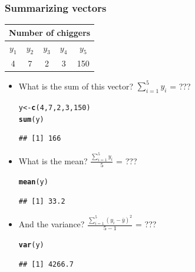 \documentclass[color=usenames,dvipsnames]{beamer}\usepackage[]{graphicx}\usepackage[]{color}
\makeatletter
\newcommand{\hlnum}[1]{\textcolor[rgb]{0.686,0.059,0.569}{#1}}%
\newcommand{\hlstd}[1]{\textcolor[rgb]{0.345,0.345,0.345}{#1}}%
\newcommand{\hlkwb}[1]{\textcolor[rgb]{0.69,0.353,0.396}{#1}}%
\newcommand{\hlkwd}[1]{\textcolor[rgb]{0.737,0.353,0.396}{\textbf{#1}}}%
\newenvironment{kframe}{%
 \def\at@end@of@kframe{}%
 \ifinner\ifhmode%
  \def\at@end@of@kframe{\end{minipage}}%
  \begin{minipage}{\columnwidth}%
 \fi\fi%
 \def\FrameCommand##1{\hskip\@totalleftmargin \hskip-\fboxsep
 \colorbox{shadecolor}{##1}\hskip-\fboxsep
     \hskip-\linewidth \hskip-\@totalleftmargin \hskip\columnwidth}%
 \MakeFramed {\advance\hsize-\width
   \@totalleftmargin\z@ \linewidth\hsize
   \@setminipage}}%
 {\par\unskip\endMakeFramed%
 \at@end@of@kframe}
\newenvironment{knitrout}{}{} %
\makeatother
\begin{document}
\begin{frame}[fragile]
  \frametitle{Summarizing vectors}
  \begin{center}
    \begin{tabular}{ccccc}
      \hline
      \multicolumn{5}{c}{Number of chiggers} \\
      \hline %
      $y_1$ & $y_2$ & $y_3$ & $y_4$ & $y_5$ \\
      \hline
      4 & 7 & 2 & 3 & 150 \\
      \hline
    \end{tabular}
  \end{center}
\begin{itemize}
\item  What is the sum of this vector? $\sum_{i=1}^5 y_i$ = ???
  \pause
\begin{knitrout}
\color{fgcolor}\begin{kframe}
\begin{alltt}
\hlstd{y} \hlkwb{<-} \hlkwd{c}\hlstd{(}\hlnum{4}\hlstd{,}\hlnum{7}\hlstd{,}\hlnum{2}\hlstd{,}\hlnum{3}\hlstd{,}\hlnum{150}\hlstd{)}
\hlkwd{sum}\hlstd{(y)}
\end{alltt}
\begin{verbatim}
## [1] 166
\end{verbatim}
\end{kframe}
\end{knitrout}
\pause
\item \large What is the mean? $\frac{\sum_{i=1}^5 y_i}{5}$ = ???
  \pause
\begin{knitrout}
\color{fgcolor}\begin{kframe}
\begin{alltt}
\hlkwd{mean}\hlstd{(y)}
\end{alltt}
\begin{verbatim}
## [1] 33.2
\end{verbatim}
\end{kframe}
\end{knitrout}
  \pause
\item  And the variance? $\frac{\sum_{i=1}^5 (y_i - \bar{y})^2}{5-1}$ = ???
\begin{knitrout}
\color{fgcolor}\begin{kframe}
\begin{alltt}
\hlkwd{var}\hlstd{(y)}
\end{alltt}
\begin{verbatim}
## [1] 4266.7
\end{verbatim}
\end{kframe}
\end{knitrout}
\end{itemize}
\end{frame}
\end{document}
